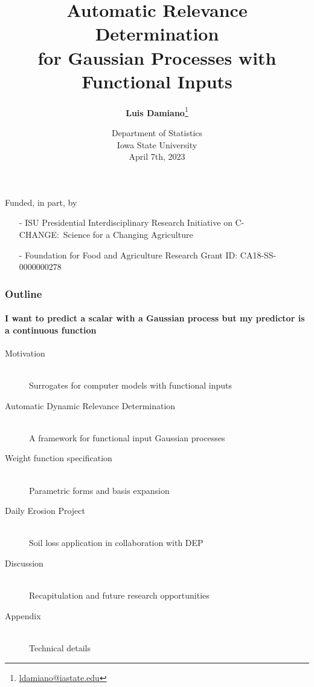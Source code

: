 \documentclass{snedecorbeamer}
\title{\textbf{Automatic Relevance Determination} \\
  for Gaussian Processes with Functional Inputs}
\author[Damiano et al]{
  \textbf{Luis Damiano}\footnote[2]{
    \tiny{\href{mailto:ldamiano@iastate.edu}{ldamiano@iastate.edu}}
  }}
\institute{
  Department of Statistics, Iowa State University
}
\date[April 7th, 2023]{
  \tiny{Department of Statistics \\
    Iowa State University} \\
  April 7th, 2023}
\begin{document}
\begin{frame}
  \titlepage{}
  {
    \tiny{
      Funded, in part, by
      \begin{itemize}
      \item[-] ISU Presidential Interdisciplinary
	Research Initiative on C-CHANGE:~Science for a Changing
	Agriculture
      \item[-] Foundation for Food and Agriculture Research
	Grant ID: CA18-SS-0000000278
      \end{itemize}
    }
  }
\end{frame}

\begin{frame}
  \frametitle{Outline}
  \framesubtitle{I want to predict a scalar with a Gaussian process but my
    predictor is a continuous function}

  \begingroup
  \begin{description}
  \item[Motivation] \mbox{}\\
    Surrogates for computer models with functional inputs
  \item[Automatic Dynamic Relevance Determination] \mbox{}\\
    \href{https://doi.org/10.48550/arXiv.2209.00044}{}
    A framework for functional input Gaussian processes
  \item[Weight function specification] \mbox{}\\
    Parametric forms and basis expansion
  \item[Daily Erosion Project] \mbox{}\\
    Soil loss application in collaboration with DEP
  \item[Discussion] \mbox{}\\
    Recapitulation and future research opportunities
  \item[Appendix] \mbox{}\\
    Technical details
  \end{description}
  \endgroup





\end{frame}
\end{document}
